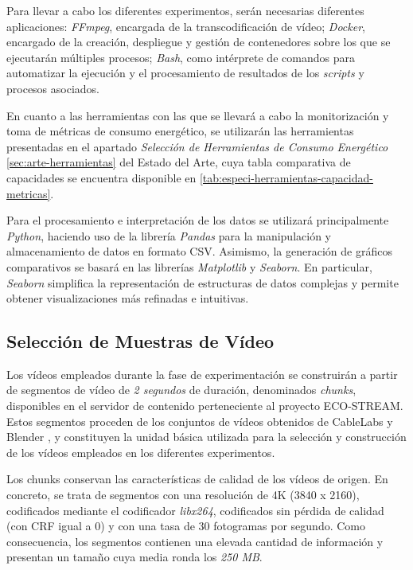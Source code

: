   Para llevar a cabo los diferentes experimentos, serán necesarias diferentes aplicaciones: \textit{FFmpeg}, encargada de la transcodificación de vídeo; \textit{Docker}, encargado de la creación, despliegue y gestión de contenedores sobre los que se ejecutarán múltiples procesos; \textit{Bash}, como intérprete de comandos para automatizar la ejecución y el procesamiento de resultados de los \textit{scripts} y procesos asociados.
  
  En cuanto a las herramientas con las que se llevará a cabo la monitorización y toma de métricas de consumo energético, se utilizarán las herramientas presentadas en el apartado \textit{Selección de Herramientas de Consumo Energético} \ref{sec:arte-herramientas} del Estado del Arte, cuya tabla comparativa de capacidades se encuentra disponible en \ref{tab:especi-herramientas-capacidad-metricas}.
  
  Para el procesamiento e interpretación de los datos se utilizará principalmente \textit{Python}, haciendo uso de la librería \textit{Pandas} para la manipulación y almacenamiento de datos en formato CSV. Asimismo, la generación de gráficos comparativos se basará en las librerías \textit{Matplotlib} y \textit{Seaborn}. En particular, \textit{Seaborn} simplifica la representación de estructuras de datos complejas y permite obtener visualizaciones más refinadas e intuitivas.


 \subsection{Selección de Muestras de Vídeo}
 Los vídeos empleados durante la fase de experimentación se construirán a partir de segmentos de vídeo de \textit{2 segundos} de duración, denominados \textit{chunks}, disponibles en el servidor de contenido perteneciente al proyecto ECO-STREAM. Estos segmentos proceden de los conjuntos de vídeos obtenidos de CableLabs \cite{cable-labs} y Blender \cite{blender-videos}, y constituyen la unidad básica utilizada para la selección y construcción de los vídeos empleados en los diferentes experimentos.
 
 Los chunks conservan las características de calidad de los vídeos de origen. En concreto, se trata de segmentos con una resolución de 4K (3840 x 2160), codificados mediante el codificador \textit{libx264}, codificados sin pérdida de calidad (con CRF igual a 0) y con una tasa de 30 fotogramas por segundo. Como consecuencia, los segmentos contienen una elevada cantidad de información y presentan un tamaño cuya media ronda los \textit{250 MB}.
 
